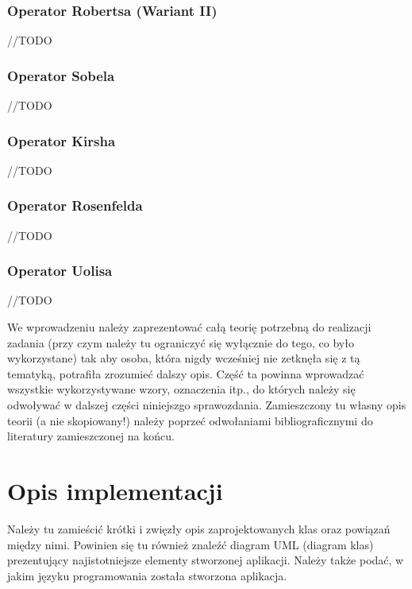 \documentclass{classrep}
\begin{document}
\subsubsection{Operator Robertsa (Wariant II)}
//TODO

\subsubsection{Operator Sobela}
//TODO

\subsubsection{Operator Kirsha}
//TODO

\subsubsection{Operator Rosenfelda}
//TODO

\subsubsection{Operator Uolisa}
//TODO

{\color{blue}
We wprowadzeniu należy zaprezentować całą teorię potrzebną do realizacji
zadania (przy czym należy tu ograniczyć się wyłącznie do tego, co było
wykorzystane) tak aby osoba, która nigdy wcześniej nie zetknęła się z tą
tematyką, potrafiła zrozumieć dalszy opis. Część ta powinna wprowadzać
wszystkie wykorzystywane wzory, oznaczenia itp., do których należy się
odwoływać w dalszej części niniejszgo sprawozdania. Zamieszczony tu własny
opis teorii (a nie skopiowany!) należy poprzeć odwołaniami bibliograficznymi
do literatury zamieszczonej na końcu. }

\section{Opis implementacji}
{\color{blue}
Należy tu zamieścić krótki i zwięzły opis zaprojektowanych klas oraz powiązań
między nimi. Powinien się tu również znaleźć diagram UML  (diagram klas)
prezentujący najistotniejsze elementy stworzonej aplikacji. Należy także
podać, w jakim języku programowania została stworzona aplikacja. }
\end{document}
